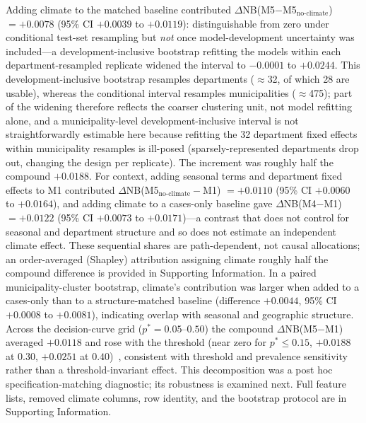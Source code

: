 \documentclass[11pt,a4paper]{article}
\begin{document}
Adding climate to the matched baseline contributed $\Delta$NB(M5$-$M5$_{\text{no-climate}}$) $=+0.0078$ (95\% CI $+0.0039$ to $+0.0119$): distinguishable from zero under conditional test-set resampling but \emph{not} once model-development uncertainty was included---a development-inclusive bootstrap refitting the models within each department-resampled replicate widened the interval to $-0.0001$ to $+0.0244$. This development-inclusive bootstrap resamples departments ($\approx$32, of which 28 are usable), whereas the conditional interval resamples municipalities ($\approx$475); part of the widening therefore reflects the coarser clustering unit, not model refitting alone, and a municipality-level development-inclusive interval is not straightforwardly estimable here because refitting the 32 department fixed effects within municipality resamples is ill-posed (sparsely-represented departments drop out, changing the design per replicate). The increment was roughly half the compound $+0.0188$. For context, adding seasonal terms and department fixed effects to M1 contributed $\Delta$NB(M5$_{\text{no-climate}}-$M1) $=+0.0110$ (95\% CI $+0.0060$ to $+0.0164$), and adding climate to a cases-only baseline gave $\Delta$NB(M4$-$M1) $=+0.0122$ (95\% CI $+0.0073$ to $+0.0171$)---a contrast that does not control for seasonal and department structure and so does not estimate an independent climate effect. These sequential shares are path-dependent, not causal allocations; an order-averaged (Shapley) attribution assigning climate roughly half the compound difference is provided in Supporting Information. In a paired municipality-cluster bootstrap, climate's contribution was larger when added to a cases-only than to a structure-matched baseline (difference $+0.0044$, 95\% CI $+0.0008$ to $+0.0081$), indicating overlap with seasonal and geographic structure. Across the decision-curve grid ($p^*=0.05$--$0.50$) the compound $\Delta$NB(M5$-$M1) averaged $+0.0118$ and rose with the threshold (near zero for $p^*\le0.15$, $+0.0188$ at $0.30$, $+0.0251$ at $0.40$)~\cite{VanCalster2019,Vickers2016}, consistent with threshold and prevalence sensitivity rather than a threshold-invariant effect. This decomposition was a post hoc specification-matching diagnostic; its robustness is examined next. Full feature lists, removed climate columns, row identity, and the bootstrap protocol are in Supporting Information.
\end{document}
